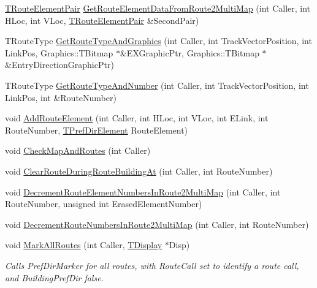 \begin{DoxyCompactItemize}
\item 
\mbox{\hyperlink{class_t_all_routes_a159a7d547e3d435d109a36cb41193a78}{T\+Route\+Element\+Pair}} \mbox{\hyperlink{class_t_all_routes_a7eda7a4b535c7538e217bbbc4d878071}{Get\+Route\+Element\+Data\+From\+Route2\+Multi\+Map}} (int Caller, int H\+Loc, int V\+Loc, \mbox{\hyperlink{class_t_all_routes_a159a7d547e3d435d109a36cb41193a78}{T\+Route\+Element\+Pair}} \&Second\+Pair)
\item 
T\+Route\+Type \mbox{\hyperlink{class_t_all_routes_afbb161c646677f13755041b895a23982}{Get\+Route\+Type\+And\+Graphics}} (int Caller, int Track\+Vector\+Position, int Link\+Pos, Graphics\+::\+T\+Bitmap $\ast$\&E\+X\+Graphic\+Ptr, Graphics\+::\+T\+Bitmap $\ast$\&Entry\+Direction\+Graphic\+Ptr)
\item 
T\+Route\+Type \mbox{\hyperlink{class_t_all_routes_a0a9ccbc84687f85806115877aa86dcfd}{Get\+Route\+Type\+And\+Number}} (int Caller, int Track\+Vector\+Position, int Link\+Pos, int \&Route\+Number)
\item 
void \mbox{\hyperlink{class_t_all_routes_a6eaa33fa8e8dcb44d0671be5889305a9}{Add\+Route\+Element}} (int Caller, int H\+Loc, int V\+Loc, int E\+Link, int Route\+Number, \mbox{\hyperlink{class_t_pref_dir_element}{T\+Pref\+Dir\+Element}} Route\+Element)
\item 
void \mbox{\hyperlink{class_t_all_routes_a54e5483e7b01daf50436e3dcc8794e77}{Check\+Map\+And\+Routes}} (int Caller)
\item 
void \mbox{\hyperlink{class_t_all_routes_ab23a53bd95aeb951108a004735b9a45e}{Clear\+Route\+During\+Route\+Building\+At}} (int Caller, int Route\+Number)
\item 
void \mbox{\hyperlink{class_t_all_routes_a5ebf1d3fbba09f98acc23b7d18822e9e}{Decrement\+Route\+Element\+Numbers\+In\+Route2\+Multi\+Map}} (int Caller, int Route\+Number, unsigned int Erased\+Element\+Number)
\item 
void \mbox{\hyperlink{class_t_all_routes_a5b18fe89f84962fca0a86063043b2a75}{Decrement\+Route\+Numbers\+In\+Route2\+Multi\+Map}} (int Caller, int Route\+Number)
\item 
\mbox{\label{class_t_all_routes_af0a34aa05027527d256566ae52600583}} 
void \mbox{\hyperlink{class_t_all_routes_af0a34aa05027527d256566ae52600583}{Mark\+All\+Routes}} (int Caller, \mbox{\hyperlink{class_t_display}{T\+Display}} $\ast$Disp)
\begin{DoxyCompactList}\small\item\em Calls Pref\+Dir\+Marker for all routes, with Route\+Call set to identify a route call, and Building\+Pref\+Dir false. \end{DoxyCompactList}\item 

\end{DoxyCompactItemize}
